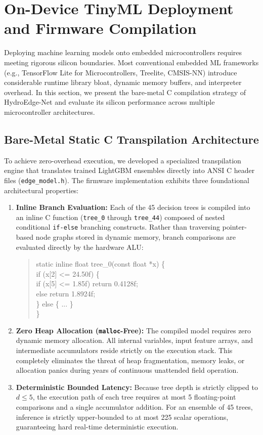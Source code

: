 \section{On-Device TinyML Deployment and Firmware Compilation}
\label{sec:deployment}

Deploying machine learning models onto embedded microcontrollers requires meeting rigorous silicon boundaries. Most conventional embedded ML frameworks (e.g., TensorFlow Lite for Microcontrollers, Treelite, CMSIS-NN) introduce considerable runtime library bloat, dynamic memory buffers, and interpreter overhead. In this section, we present the bare-metal C compilation strategy of HydroEdge-Net and evaluate its silicon performance across multiple microcontroller architectures.

\subsection{Bare-Metal Static C Transpilation Architecture}

To achieve zero-overhead execution, we developed a specialized transpilation engine that translates trained LightGBM ensembles directly into ANSI C header files (\texttt{edge\_model.h}). The firmware implementation exhibits three foundational architectural properties:
\begin{enumerate}
    \item \textbf{Inline Branch Evaluation:} Each of the 45 decision trees is compiled into an inline C function (\texttt{tree\_0} through \texttt{tree\_44}) composed of nested conditional \texttt{if-else} branching constructs. Rather than traversing pointer-based node graphs stored in dynamic memory, branch comparisons are evaluated directly by the hardware ALU:
\begin{quote}
\small\ttfamily
static inline float tree\_0(const float *x) \{\\
\mbox{}\quad if (x[2] <= 24.50f) \{\\
\mbox{}\quad\quad if (x[5] <= 1.85f) return 0.4128f;\\
\mbox{}\quad\quad else return 1.8924f;\\
\mbox{}\quad \} else \{ ... \}\\
\}
\end{quote}
    \item \textbf{Zero Heap Allocation (\texttt{malloc}-Free):} The compiled model requires zero dynamic memory allocation. All internal variables, input feature arrays, and intermediate accumulators reside strictly on the execution stack. This completely eliminates the threat of heap fragmentation, memory leaks, or allocation panics during years of continuous unattended field operation.
    \item \textbf{Deterministic Bounded Latency:} Because tree depth is strictly clipped to $d \le 5$, the execution path of each tree requires at most 5 floating-point comparisons and a single accumulator addition. For an ensemble of 45 trees, inference is strictly upper-bounded to at most 225 scalar operations, guaranteeing hard real-time deterministic execution.
\end{enumerate}

